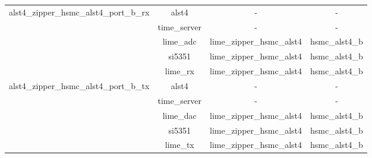 \documentclass{article}
\def\comp{alst4}
\begin{document}
\begin{tabular}{|c|c|c|c|}
		\hline
		\multirow{5}{*}{alst4\_zipper\_hsmc\_alst4\_port\_b\_rx} &\comp & - & - \\ &time\_server & - & - \\ &lime\_adc & lime\_zipper\_hsmc\_alst4 & hsmc\_alst4\_b \\  &si5351 & lime\_zipper\_hsmc\_alst4 & hsmc\_alst4\_b \\ &lime\_rx & lime\_zipper\_hsmc\_alst4 & hsmc\_alst4\_b \\
		\hline
		\multirow{5}{*}{alst4\_zipper\_hsmc\_alst4\_port\_b\_tx} &\comp & - & - \\ &time\_server & - & - \\ &lime\_dac & lime\_zipper\_hsmc\_alst4 & hsmc\_alst4\_b \\  &si5351 & lime\_zipper\_hsmc\_alst4 & hsmc\_alst4\_b \\ &lime\_tx & lime\_zipper\_hsmc\_alst4 & hsmc\_alst4\_b \\
		\hline
	\end{tabular}
\end{document}
